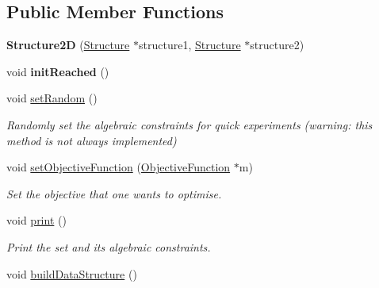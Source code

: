 \subsection*{Public Member Functions}
\begin{DoxyCompactItemize}
\item 
\hypertarget{classStructure2D_acf11018d9c07b17ae9994a2748a5b595}{{\bfseries Structure2\-D} (\hyperlink{classStructure}{Structure} $\ast$structure1, \hyperlink{classStructure}{Structure} $\ast$structure2)}\label{classStructure2D_acf11018d9c07b17ae9994a2748a5b595}

\item 
\hypertarget{classStructure2D_a7d494335421734e80964f0907f0869d2}{void {\bfseries init\-Reached} ()}\label{classStructure2D_a7d494335421734e80964f0907f0869d2}

\item 
\hypertarget{classStructure2D_a0074288112f5f352f4d5b2f068551ae4}{void \hyperlink{classStructure2D_a0074288112f5f352f4d5b2f068551ae4}{set\-Random} ()}\label{classStructure2D_a0074288112f5f352f4d5b2f068551ae4}

\begin{DoxyCompactList}\small\item\em Randomly set the algebraic constraints for quick experiments (warning\-: this method is not always implemented) \end{DoxyCompactList}\item 
void \hyperlink{classStructure2D_a85e5a4395ec60a75f3bcd1c7cacd6e2c}{set\-Objective\-Function} (\hyperlink{classObjectiveFunction}{Objective\-Function} $\ast$m)
\begin{DoxyCompactList}\small\item\em Set the objective that one wants to optimise. \end{DoxyCompactList}\item 
\hypertarget{classStructure2D_ac51082d3ad73344ea13921dd450d865f}{void \hyperlink{classStructure2D_ac51082d3ad73344ea13921dd450d865f}{print} ()}\label{classStructure2D_ac51082d3ad73344ea13921dd450d865f}

\begin{DoxyCompactList}\small\item\em Print the set and its algebraic constraints. \end{DoxyCompactList}\item 
\hypertarget{classStructure2D_a337047bfc3a936c9e3255e8b4844e734}{void \hyperlink{classStructure2D_a337047bfc3a936c9e3255e8b4844e734}{build\-Data\-Structure} ()}\label{classStructure2D_a337047bfc3a936c9e3255e8b4844e734}


\end{DoxyCompactItemize}
